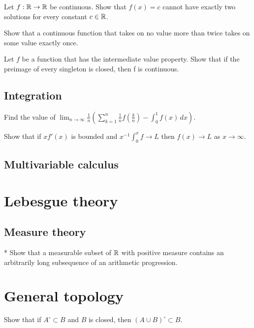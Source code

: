 \documentclass[12pt]{article}
\begin{document}
	\begin{prb}
	Let $f:\mathbb{R}\to\mathbb{R}$ be continuous. Show that $f(x)=c$ cannot have exactly two solutions for every constant $c\in\mathbb{R}$.
	\end{prb}

	\begin{prb}
	Show that a continuous function that takes on no value more than twice takes on some value exactly once.
	\end{prb}

	\begin{prb}
	Let $f$ be a function that has the intermediate value property. Show that if the preimage of every singleton is closed, then f is continuous.
	\end{prb}

	\subsection{Integration}
	\begin{prb}
	Find the value of $\lim_{n\to\infty}\frac1n\left(\sum_{k=1}^n\frac1nf\left(\frac kn\right)-\int_0^1f(x)\,dx\right)$.
	\end{prb}

	\begin{prb}
	Show that if $xf'(x)$ is bounded and $x^{-1}\int_0^xf\to L$ then $f(x)\to L$ as $x\to\infty$.
	\end{prb}

	\subsection{Multivariable calculus}




\section{Lebesgue theory}
	\subsection{Measure theory}
	\begin{prb}*
	Show that a measurable subset of $\mathbb{R}$ with positive measure contains an arbitrarily long subsequence of an arithmetic progression.
	\end{prb}


\section{General topology}
	\begin{prb}
	Show that if $A^\circ\subset B$ and $B$ is closed, then $(A\cup B)^\circ\subset B$.
	\end{prb}
\end{document}
